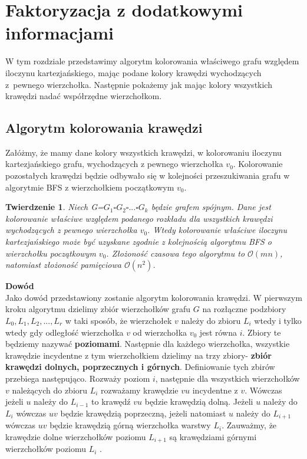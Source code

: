\documentclass[12pt,a4paper,titlepage]{article}
\newtheorem{twr}{Twierdzenie}
\newcommand\tab[1][1cm]{\hspace*{#1}}
\begin{document}
\section{Faktoryzacja z dodatkowymi informacjami}
W tym rozdziale przedstawimy algorytm kolorowania właściwego grafu względem iloczynu kartezjańskiego, mając podane kolory krawędzi wychodzących z~pewnego wierzchołka. Następnie pokażemy jak mając kolory wszystkich krawędzi nadać współrzędne wierzchołkom. 
\\
\subsection{Algorytm kolorowania krawędzi}
Załóżmy, że mamy dane kolory wszystkich krawędzi, w kolorowaniu iloczynu kartezjańskiego grafu, wychodzących z pewnego wierzchołka $v_0$. Kolorowanie pozostałych krawędzi będzie odbywało się w kolejności przeszukiwania grafu w algorytmie BFS z wierzchołkiem początkowym $v_0$. \\
\begin{twr}Niech G=$G_1 \square G_2 \square ... \square G_k$ będzie grafem spójnym. Dane jest kolorowanie właściwe względem podanego rozkładu dla wszystkich krawędzi wychodzących z pewnego wierzchołka $v_0$. Wtedy kolorowanie właściwe iloczynu kartezjańskiego może być uzyskane zgodnie z kolejnością algorytmu BFS o wierzchołku początkowym $v_0$. Złożoność czasowa tego algorytmu to $\mathcal{O}(mn)$, natomiast złożoność pamięciowa $\mathcal{O}(n^2)$.
\end{twr}
\tab[-0.6cm]\textbf{Dowód}\\
\tab[0.6cm]Jako dowód przedstawiony zostanie algorytm kolorowania krawędzi. W pierwszym kroku algorytmu dzielimy zbiór wierzchołków grafu $G$ na rozłączne podzbiory $L_0 , L_1, L_2 , ..., L_r$ w taki sposób, że wierzchołek $v$ należy do zbioru $L_i$ wtedy i tylko wtedy gdy odległość wierzchołka $v$ od wierzchołka $v_0$ jest równa $i$. Zbiory te będziemy nazywać \textbf{poziomami}. Następnie dla każdego wierzchołka, wszystkie krawędzie incydentne z tym wierzchołkiem dzielimy na trzy zbiory- \textbf{zbiór krawędzi dolnych, poprzecznych i górnych}. Definiowanie tych zbirów przebiega następująco. Rozważy poziom $i$, następnie dla wszystkich wierzchołków $v$ należących do zbioru $L_i$ rozważamy krawędzie $vu$ incydentne z $v$. Wówczas jeżeli $u$ należy do $L_{i-1}$ to krawędź $vu$ będzie krawędzią dolną. Jeżeli $u$ należy do $L_i$ wówczas $uv$ będzie krawędzią poprzeczną, jeżeli natomiast $u$ należy do $L_{i+1}$ wówczas $uv$ będzie krawędzią górną wierzchołka warstwy $L_i$. Zauważmy, że krawędzie dolne wierzchołków poziomu $L_{i+1}$ są krawędziami górnymi wierzchołków poziomu $L_{i}$ .\\
\end{document}
